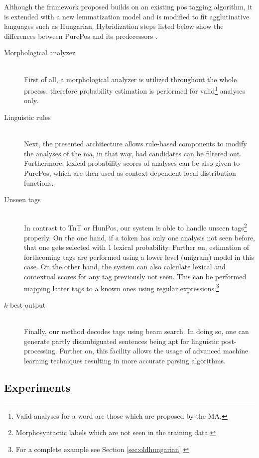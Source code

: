 Although the framework proposed builds on an existing \gls{pos} tagging algorithm, it is extended with a new lemmatization model and is modified to fit agglutinative languages such as Hungarian. 
Hybridization steps listed below show the differences between PurePos and its predecessors \cite{Brants2000,Halacsy2007}.

\begin{description}
  \item[Morphological analyzer] \hfill \\
  First of all, a morphological analyzer is utilized throughout the whole process, therefore probability estimation is performed for valid\footnote{Valid analyses for a word are those which are proposed by the MA.} analyses only.
  \item[Linguistic rules] \hfill \\
  Next, the presented architecture allows rule-based components to modify the analyses of the \acrshort{ma}, in that way, bad candidates can be filtered out. Furthermore, lexical probability scores of analyses can be also given to PurePos, which are then used as context-dependent local distribution functions. 
  \item[Unseen tags] \hfill \\ 
  In contrast to TnT or HunPos, our system is able to handle unseen tags\footnote{Morphosyntactic labels which are not seen in the training data.} properly. On the one hand, if a token has only one analysis not seen before, that one gets selected with 1 lexical probability. Further on, estimation of forthcoming tags are performed using a lower level (unigram) model in this case. On the other hand, the system can also calculate lexical and contextual scores for any tag previously not seen. This can be performed mapping latter tags to a known ones using regular expressions.\footnote{For a complete example see Section \ref{sec:oldhungarian}.}
  \item[$k$-best output] \hfill \\
  Finally, our method decodes tags using beam search. In doing so, one can generate partly disambiguated sentences being apt for linguistic post-processing. Further on, this facility allows the usage of advanced machine learning techniques resulting in more accurate parsing algorithms.
\end{description}


\subsection{Experiments}

